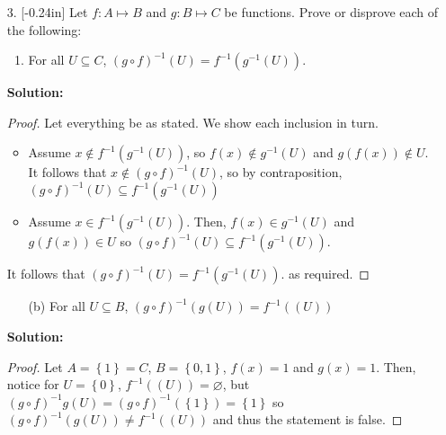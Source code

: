 \documentclass[letterpaper,12pt]{article}
\newcommand{\set}[1]{\left\{ #1 \right\}}
\theoremstyle{definition}
\begin{document}
\begin{enumerate}
    \item[3. ]\reversemarginpar{}[-0.24in] Let $f: A \mapsto B$ and $g: B \mapsto C$ be functions. Prove or disprove each of the following: \begin{enumerate}
        \item For all $U \subseteq C$, $(g \circ f)^{-1} (U) = f^{-1}(g^{-1}(U))$.
        
    \end{enumerate}
     \begin{mdframed}
            \textbf{Solution:} 
           \begin{proof}
              Let everything be as stated. We show each inclusion in turn. \begin{itemize}
                  \item Assume $x \notin f^{-1}(g^{-1}(U))$, so $f(x) \notin g^{-1}(U)$ and $g(f (x)) \notin U$. It follows that $x \notin (g \circ f)^{-1} (U)$, so by contraposition, $(g \circ f)^{-1} (U) \subseteq f^{-1}(g^{-1}(U))$
                  \item Assume $x \in f^{-1}(g^{-1}(U))$. Then, $f(x) \in g^{-1}(U)$ and $g(f(x)) \in U$ so $(g \circ f)^{-1} (U) \subseteq f^{-1}(g^{-1}(U))$.
              \end{itemize}
              It follows that $(g \circ f)^{-1} (U) = f^{-1}(g^{-1}(U))$. as required.
           \end{proof} 
        \end{mdframed}
\end{enumerate}
\pagebreak
\begin{enumerate}
    \item[] \begin{enumerate}
        \item[(b)] For all $U \subseteq B$, $(g\circ f)^{-1}(g(U)) = f^{-1}((U))$
    \end{enumerate}
     \begin{mdframed}
            \textbf{Solution:}
            \renewcommand{\proofname}{Disproof} \begin{proof}
                Let $A = \set{1} = C$, $B = \set{0,1}$, $f(x) = 1$ and $g(x) = 1$. Then, notice for $U = \set{0}$, $f^{-1}((U)) = \varnothing$, but $(g\circ f)^{-1}g(U) = (g\circ f)^{-1} (\set{1}) = \set{1}$ so $(g\circ f)^{-1}(g(U)) \neq f^{-1}((U))$ and thus the statement is false.
            \end{proof}
        \end{mdframed}
\end{enumerate}
\end{document}
